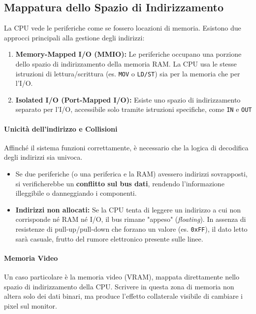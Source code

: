 \documentclass[a4paper,12pt]{article}
\begin{document}
	\subsection{Mappatura dello Spazio di Indirizzamento}
	
	La CPU vede le periferiche come se fossero locazioni di memoria. Esistono due approcci principali alla gestione degli indirizzi:
	
	\begin{enumerate}
		\item \textbf{Memory-Mapped I/O (MMIO):} Le periferiche occupano una porzione dello spazio di indirizzamento della memoria RAM. La CPU usa le stesse istruzioni di lettura/scrittura (es. \texttt{MOV} o \texttt{LD/ST}) sia per la memoria che per l'I/O.
		\item \textbf{Isolated I/O (Port-Mapped I/O):} Esiste uno spazio di indirizzamento separato per l'I/O, accessibile solo tramite istruzioni specifiche, come \texttt{IN} e \texttt{OUT} 
	\end{enumerate}
	
	\paragraph{Unicità dell'indirizzo e Collisioni}
	Affinché il sistema funzioni correttamente, è necessario che la logica di decodifica degli indirizzi sia univoca. 
	\begin{itemize}
		\item Se due periferiche (o una periferica e la RAM) avessero indirizzi sovrapposti, si verificherebbe un \textbf{conflitto sul bus dati}, rendendo l'informazione illeggibile o danneggiando i componenti.
		\item \textbf{Indirizzi non allocati:} Se la CPU tenta di leggere un indirizzo a cui non corrisponde né RAM né I/O, il bus rimane "appeso" (\textit{floating}). In assenza di resistenze di pull-up/pull-down che forzano un valore (es. \texttt{0xFF}), il dato letto sarà casuale, frutto del rumore elettronico presente sulle linee.
	\end{itemize}
	
	\paragraph{Memoria Video}
	Un caso particolare è la memoria video (VRAM), mappata direttamente nello spazio di indirizzamento della CPU. Scrivere in questa zona di memoria non altera solo dei dati binari, ma produce l'effetto collaterale visibile di cambiare i pixel sul monitor.
	
\end{document}
